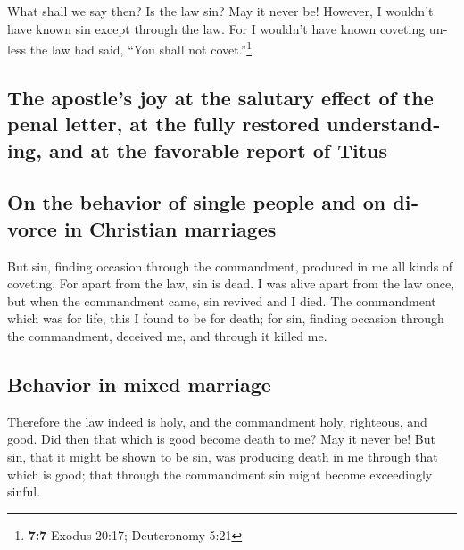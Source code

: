 \begin{paracol}{2}
\begin{otherlanguage}{english}
 What shall we say then? Is the law sin? May it never be!
However, I wouldn't have known sin except through the law. For I
wouldn't have known coveting unless the law had said, ``You shall not
covet.''\footnote{\textbf{7:7} Exodus 20:17; Deuteronomy 5:21}

\hypertarget{the-apostles-joy-at-the-salutary-effect-of-the-penal-letter-at-the-fully-restored-understanding-and-at-the-favorable-report-of-titus}{%
\subsection{The apostle's joy at the salutary effect of the penal
letter, at the fully restored understanding, and at the favorable report
of
Titus}\label{the-apostles-joy-at-the-salutary-effect-of-the-penal-letter-at-the-fully-restored-understanding-and-at-the-favorable-report-of-titus}}

\hypertarget{on-the-behavior-of-single-people-and-on-divorce-in-christian-marriages}{%
\subsection{On the behavior of single people and on divorce in Christian
marriages}\label{on-the-behavior-of-single-people-and-on-divorce-in-christian-marriages}}

 But sin, finding occasion through the commandment,
produced in me all kinds of coveting. For apart from the law, sin is
dead.  I was alive apart from the law once, but when the
commandment came, sin revived and I died.  The
commandment which was for life, this I found to be for death;
 for sin, finding occasion through the commandment,
deceived me, and through it killed me.

\hypertarget{behavior-in-mixed-marriage}{%
\subsection{Behavior in mixed
marriage}\label{behavior-in-mixed-marriage}}

 Therefore the law indeed is holy, and the commandment
holy, righteous, and good.  Did then that which is good
become death to me? May it never be! But sin, that it might be shown to
be sin, was producing death in me through that which is good; that
through the commandment sin might become exceedingly sinful.

\hypertarget{the-impotence-of-the-law-and-of-good-will-in-the-face-of-sin-as-power-in-the-flesh}{%
}
\end{otherlanguage}
\end{paracol}
